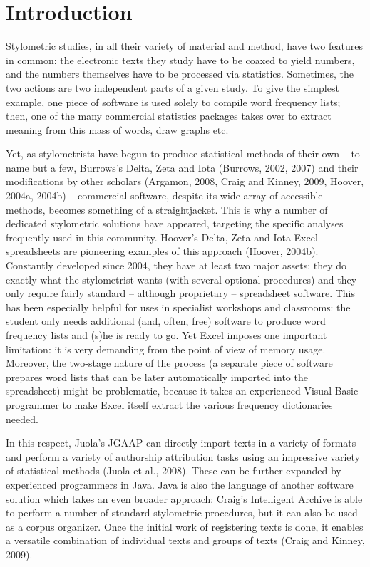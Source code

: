 \documentclass[11pt,a4paper]{article}
\begin{document}
\bigskip

\tableofcontents

\bigskip\bigskip



\section{Introduction}

Stylometric studies, in all their variety of material and method,
have two features in common: the electronic texts they study have
to be coaxed to yield numbers, and the numbers themselves have to
be processed via statistics. Sometimes, the two actions are two independent
parts of a given study. To give the simplest example, one piece of
software is used solely to compile word frequency lists; then, one
of the many commercial statistics packages takes over to extract meaning
from this mass of words, draw graphs etc.

Yet, as stylometrists have begun to produce statistical methods of
their own – to name but a few, Burrows’s Delta, Zeta and Iota (Burrows,
2002, 2007) and their modifications by other scholars (Argamon, 2008,
Craig and Kinney, 2009, Hoover, 2004a, 2004b) – commercial software,
despite its wide array of accessible methods, becomes something of
a straightjacket. This is why a number of dedicated stylometric solutions
have appeared, targeting the specific analyses frequently used in
this community. Hoover’s Delta, Zeta and Iota Excel spreadsheets are
pioneering examples of this approach (Hoover, 2004b). Constantly developed
since 2004, they have at least two major assets: they do exactly what
the stylometrist wants (with several optional procedures) and they
only require fairly standard -- although proprietary -- spreadsheet
software. This has been especially helpful for uses in specialist
workshops and classrooms: the student only needs additional (and,
often, free) software to produce word frequency lists and (s)he is
ready to go. Yet Excel imposes one important limitation: it is very
demanding from the point of view of memory usage. Moreover, the two-stage
nature of the process (a separate piece of software prepares word
lists that can be later automatically imported into the spreadsheet)
might be problematic, because it takes an experienced Visual Basic
programmer to make Excel itself extract the various frequency dictionaries
needed.

In this respect, Juola's JGAAP can directly import texts in a variety
of formats and perform a variety of authorship attribution tasks using
an impressive variety of statistical methods (Juola et al., 2008).
These can be further expanded by experienced programmers in Java.
Java is also the language of another software solution which takes
an even broader approach: Craig's Intelligent Archive is able to perform
a number of standard stylometric procedures, but it can also be used
as a corpus organizer. Once the initial work of registering texts
is done, it enables a versatile combination of individual texts and
groups of texts (Craig and Kinney, 2009).
\end{document}
